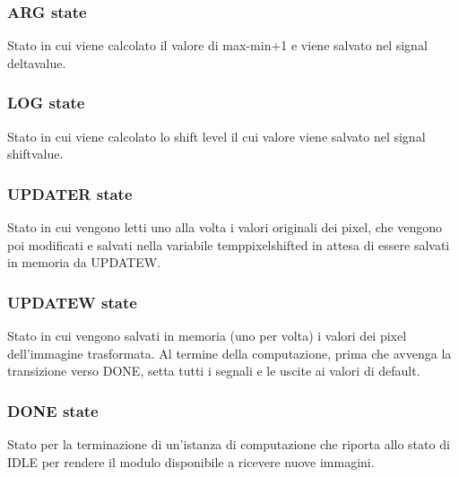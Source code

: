 \documentclass{article}
\begin{document}
\subsubsection{\textbf{ARG} state}
Stato in cui viene calcolato il valore di max-min+1 e viene salvato nel signal delta\textunderscore value.
\subsubsection{\textbf{LOG} state}
Stato in cui viene calcolato lo shift level il cui valore viene salvato nel signal shift\textunderscore value.
\subsubsection{\textbf{UPDATE\textunderscore R} state}
Stato in cui vengono letti uno alla volta i valori originali dei pixel, che vengono poi modificati e salvati nella variabile temp\textunderscore pixel\textunderscore shifted in attesa di essere salvati in memoria da UPDATE\textunderscore W.
\subsubsection{\textbf{UPDATE\textunderscore W} state}
Stato in cui vengono salvati in memoria (uno per volta) i valori dei pixel dell'immagine trasformata. Al termine della computazione, prima che avvenga la transizione verso DONE, setta tutti i segnali e le uscite ai valori di default.
\subsubsection{\textbf{DONE state}}
Stato per la terminazione di un’istanza di computazione che riporta allo stato di IDLE per rendere il modulo disponibile a ricevere nuove immagini.
\end{document}
